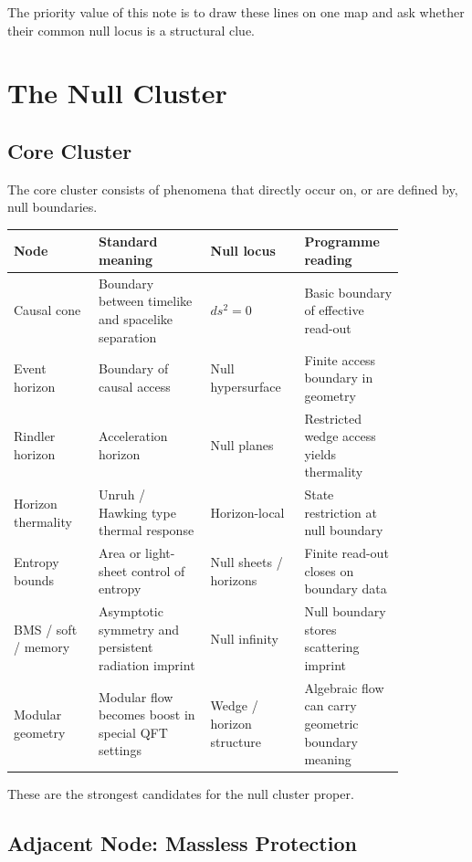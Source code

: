 \documentclass[12pt,a4paper]{article}
\theoremstyle{definition}
\theoremstyle{remark}
\begin{document}
The priority value of this note is to draw these lines on one map and
ask whether their common null locus is a structural clue.

\section{The Null Cluster}\label{the-null-cluster}

\subsection{Core Cluster}\label{core-cluster}

The core cluster consists of phenomena that directly occur on, or are
defined by, null boundaries.

\begin{center}
\begin{tabular}{P{0.19\linewidth}P{0.25\linewidth}P{0.19\linewidth}P{0.22\linewidth}}
\toprule
\textbf{Node} & \textbf{Standard meaning} & \textbf{Null locus} & \textbf{Programme reading} \\
\midrule
Causal cone & Boundary between timelike and spacelike separation & $ds^2=0$ & Basic boundary of effective read-out \\
Event horizon & Boundary of causal access & Null hypersurface & Finite access boundary in geometry \\
Rindler horizon & Acceleration horizon & Null planes & Restricted wedge access yields thermality \\
Horizon thermality & Unruh / Hawking type thermal response & Horizon-local & State restriction at null boundary \\
Entropy bounds & Area or light-sheet control of entropy & Null sheets / horizons & Finite read-out closes on boundary data \\
BMS / soft / memory & Asymptotic symmetry and persistent radiation imprint & Null infinity & Null boundary stores scattering imprint \\
Modular geometry & Modular flow becomes boost in special QFT settings & Wedge / horizon structure & Algebraic flow can carry geometric boundary meaning \\
\bottomrule
\end{tabular}
\end{center}

These are the strongest candidates for the null cluster proper.

\subsection{Adjacent Node: Massless
Protection}\label{adjacent-node-massless-protection}
\end{document}
